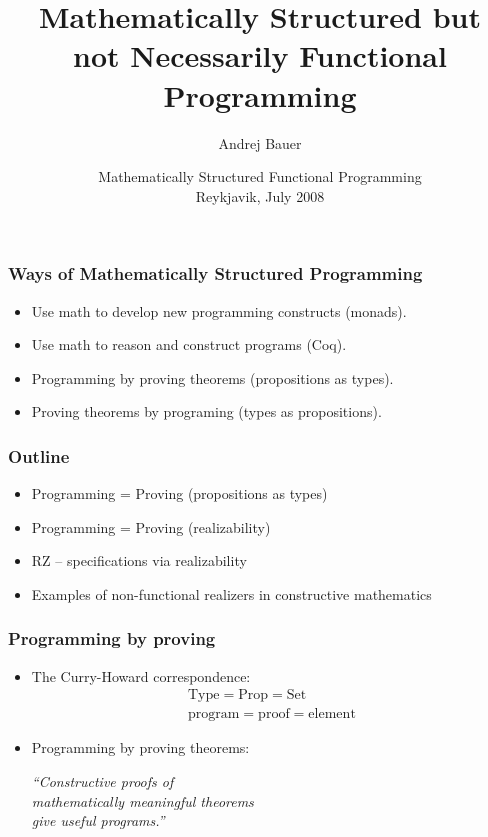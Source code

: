 \documentclass[t]{beamer}
\title{Mathematically Structured but\\
not Necessarily Functional Programming}
\author{Andrej Bauer}
\institute{Department of Mathematics and Physics\\
  University of Ljubljana, Slovenia}
\date{Mathematically Structured Functional Programming\\Reykjavik, July 2008}
\begin{document}
\begin{frame}
  \titlepage
\end{frame}

\begin{frame}
  \frametitle{Ways of Mathematically Structured Programming}

  \begin{itemize}
  \item Use math to develop new programming constructs (monads).
  \item Use math to reason and construct programs (Coq).
  \item Programming by proving theorems (propositions as types).
  \item Proving theorems by programing (types as propositions).
  \end{itemize}
\end{frame}

\begin{frame}
  \frametitle{Outline}

  \begin{itemize}
  \item Programming = Proving (propositions as types)
  \item Programming = Proving (realizability)
  \item RZ -- specifications via realizability
  \item Examples of non-functional realizers in constructive mathematics
  \end{itemize}
  
\end{frame}


\begin{frame}
  \frametitle{Programming by proving}

  \begin{itemize}
  \item The Curry-Howard correspondence:
    \begin{gather*}
      \mathrm{Type} = \mathrm{Prop} = \mathrm{Set} \\
      \mathrm{program} = \mathrm{proof} = \mathrm{element}
    \end{gather*}
  \item Programming by proving theorems:
    \begin{center}
      \emph{``Constructive proofs of \\
        mathematically meaningful theorems \\
        give useful programs.''}
  \end{center}
  \end{itemize}
\end{frame}
\end{document}
